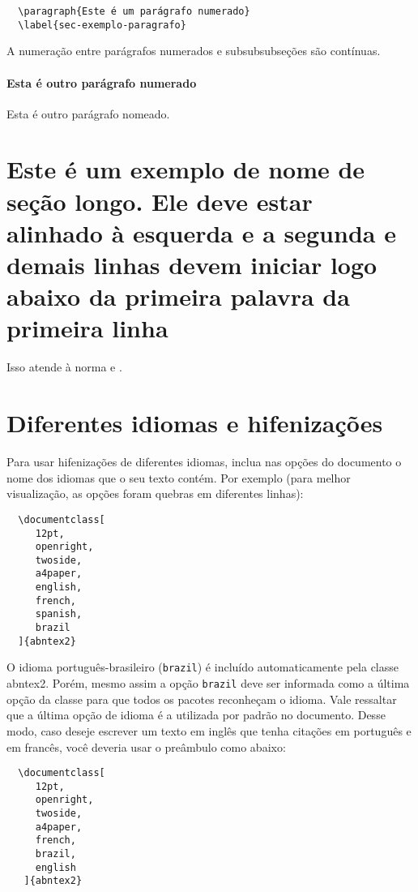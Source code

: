 \documentclass[12pt,oneside,a4paper,chapter=TITLE,
			   english,brazil]{abntex2}
\begin{document}
\begin{anexosenv}
\begin{verbatim}
  \paragraph{Este é um parágrafo numerado}
  \label{sec-exemplo-paragrafo}
\end{verbatim}

A numeração entre parágrafos numerados e subsubsubseções são contínuas.

\paragraph{Esta é outro parágrafo numerado}\label{sec-exemplo-paragrafo-outro}

Esta é outro parágrafo nomeado.

\section{Este é um exemplo de nome de seção longo. Ele deve estar alinhado à esquerda e a segunda e demais linhas devem iniciar logo abaixo da primeira palavra da primeira linha}

Isso atende à norma   e .

\section{Diferentes idiomas e hifenizações}
\label{sec-hifenizacao}

Para usar hifenizações de diferentes idiomas, inclua nas opções do documento o nome dos idiomas que o seu texto contém. Por exemplo (para melhor visualização, as opções foram quebras em diferentes linhas):
\begin{verbatim}
  \documentclass[
     12pt,
     openright,
     twoside,
     a4paper,
     english,
     french,
     spanish,
     brazil
  ]{abntex2}
\end{verbatim}

O idioma português-brasileiro (\texttt{brazil}) é incluído automaticamente pela classe \textsf{abntex2}. Porém, mesmo assim a opção \texttt{brazil} deve ser informada como a última opção da classe para que todos os pacotes reconheçam o idioma. Vale ressaltar que a última opção de idioma é a utilizada por padrão no documento. Desse modo, caso deseje escrever um texto em inglês que tenha citações em português e em francês, você deveria usar o preâmbulo como abaixo:
\begin{verbatim}
  \documentclass[
     12pt,
     openright,
     twoside,
     a4paper,
     french,
     brazil,
     english
   ]{abntex2}
\end{verbatim}


\end{anexosenv}
\end{document}
